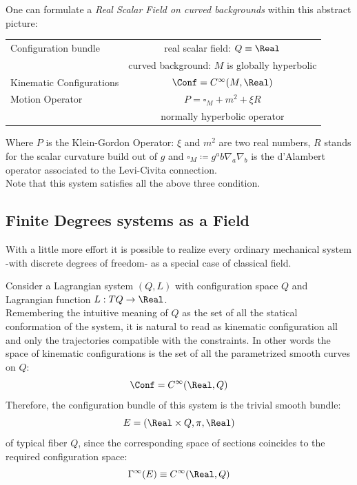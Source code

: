 \documentclass[Main]{subfiles}
\begin{document}
		\begin{example}
		One can formulate a \emph{Real Scalar Field on curved backgrounds} within this abstract picture:
			\begin{center}\begin{tabular}{|l|c|}
			\hline
			Configuration bundle & real scalar field: $Q \equiv \Real$\\
													& curved background: $M$ is globally hyperbolic\\
			\hline
			Kinematic Configurations & $\Conf = C^\infty(M,\Real)$\\
			\hline
			Motion Operator			&  $P=\square_M + m^2 + \xi R$ \\
													& normally hyperbolic operator\\
			\hline
			\end{tabular}\end{center}
			Where $P$ is the Klein-Gordon Operator: $\xi$ and $m^2$ are two real numbers, $R$ stands for the scalar curvature build out of $g$ and $\square_M \coloneqq g^ab \nabla_a \nabla_b$ is the d'Alambert operator associated to the Levi-Civita connection.	
		\\
		Note that this system satisfies all the above three condition.
		\end{example}
	



		\subsection{Finite Degrees systems as a Field}\label{MechanicsAsAField}
			With a little more effort it is possible to realize every ordinary mechanical system  -with discrete degrees of freedom- as a special case of classical field.
			
			Consider a Lagrangian system $(Q, L)$ with configuration space $Q$ and Lagrangian function $L: TQ\rightarrow \Real$.
			\\
			Remembering the intuitive meaning of $Q$ as the set of all the statical conformation of the system, it is natural to read as kinematic configuration all and only the trajectories compatible with the constraints.
			In other words the space of kinematic configurations is the set of all the parametrized smooth curves on $Q$:
			\begin{displaymath}
				\Conf = C^\infty(\Real,Q)
			\end{displaymath}
			Therefore, the configuration bundle of this system is the trivial smooth bundle:
			\begin{displaymath}
				E= ( \Real\times Q, \pi, \Real)
			\end{displaymath}
			of typical fiber $Q$, since the corresponding space of sections coincides to  the required configuration space:
			\begin{displaymath}
				\Gamma^\infty(E) \equiv C^\infty(\Real,Q)
			\end{displaymath}
\end{document}
